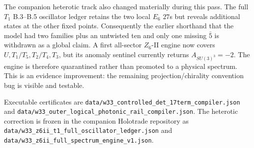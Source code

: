 The companion heterotic track also changed materially during this pass. The
full \(T_1\) B.3--B.5 oscillator ledger retains the two local \(E_6\) \(27\)s
but reveals additional states at the other fixed points. Consequently the
earlier shorthand that the model had two families plus an untwisted ten and
only one missing \(\bar5\) is withdrawn as a global claim. A first all-sector
\(Z_6\)-II engine now covers \(U,T_1/T_5,T_2/T_4,T_3\), but its anomaly
sentinel currently returns \(A_{SU(3)^3}=-2\). The engine is therefore
quarantined rather than promoted to a physical spectrum. This is an evidence
improvement: the remaining projection/chirality convention bug is visible and
testable.

Executable certificates are
\texttt{data/w33\_controlled\_det\_17term\_compiler.json} and
\texttt{data/w33\_outer\_logical\_photonic\_rail\_compiler.json}.
The heterotic correction is frozen in the companion Holotrade repository as
\texttt{data/w33\_z6ii\_t1\_full\_oscillator\_ledger.json} and
\texttt{data/w33\_z6ii\_full\_spectrum\_engine\_v1.json}.

